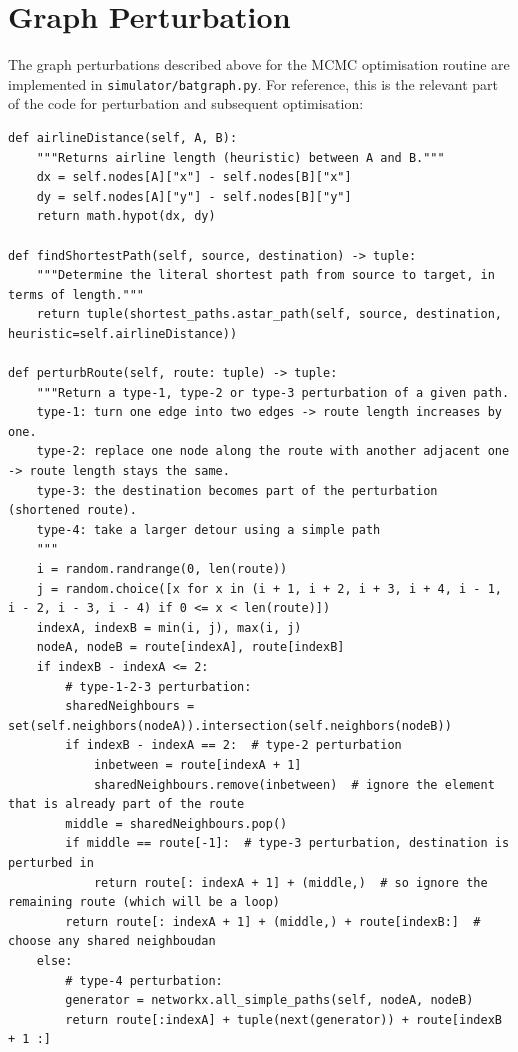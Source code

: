\documentclass{prettytex/ox/mmsc-special-topic}
\begin{document}
  \section{Graph Perturbation}
  The graph perturbations described above for the MCMC optimisation routine are implemented in \texttt{simulator/batgraph.py}. For reference, this is the relevant part of the code for perturbation and subsequent optimisation:

  \begin{verbatim}
def airlineDistance(self, A, B):
    """Returns airline length (heuristic) between A and B."""
    dx = self.nodes[A]["x"] - self.nodes[B]["x"]
    dy = self.nodes[A]["y"] - self.nodes[B]["y"]
    return math.hypot(dx, dy)

def findShortestPath(self, source, destination) -> tuple:
    """Determine the literal shortest path from source to target, in terms of length."""
    return tuple(shortest_paths.astar_path(self, source, destination, heuristic=self.airlineDistance))

def perturbRoute(self, route: tuple) -> tuple:
    """Return a type-1, type-2 or type-3 perturbation of a given path.
    type-1: turn one edge into two edges -> route length increases by one.
    type-2: replace one node along the route with another adjacent one -> route length stays the same.
    type-3: the destination becomes part of the perturbation (shortened route).
    type-4: take a larger detour using a simple path
    """
    i = random.randrange(0, len(route))
    j = random.choice([x for x in (i + 1, i + 2, i + 3, i + 4, i - 1, i - 2, i - 3, i - 4) if 0 <= x < len(route)])
    indexA, indexB = min(i, j), max(i, j)
    nodeA, nodeB = route[indexA], route[indexB]
    if indexB - indexA <= 2:
        # type-1-2-3 perturbation:
        sharedNeighbours = set(self.neighbors(nodeA)).intersection(self.neighbors(nodeB))
        if indexB - indexA == 2:  # type-2 perturbation
            inbetween = route[indexA + 1]
            sharedNeighbours.remove(inbetween)  # ignore the element that is already part of the route
        middle = sharedNeighbours.pop()
        if middle == route[-1]:  # type-3 perturbation, destination is perturbed in
            return route[: indexA + 1] + (middle,)  # so ignore the remaining route (which will be a loop)
        return route[: indexA + 1] + (middle,) + route[indexB:]  # choose any shared neighboudan
    else:
        # type-4 perturbation:
        generator = networkx.all_simple_paths(self, nodeA, nodeB)
        return route[:indexA] + tuple(next(generator)) + route[indexB + 1 :]
  \end{verbatim}
\end{document}
